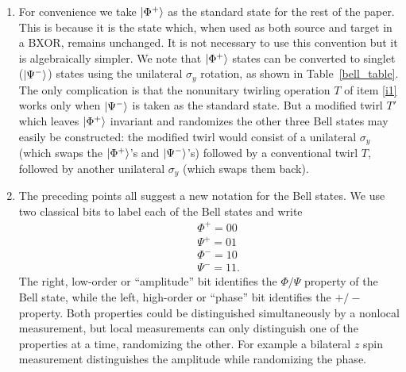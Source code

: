 \begin{enumerate}
\item For convenience we take $| \Phi^+ \rangle$ as the standard state for
the rest of the paper.  This is because it is the state which, when
used as both source and target in a BXOR, remains unchanged.  It is
not necessary to use this convention but it is algebraically simpler.
We note that $| \Phi^+ \rangle$ states can be converted to singlet
($| \Psi^- \rangle$) states using the unilateral $\sigma_y$ rotation, as
shown in Table~\ref{bell_table}.  The only complication is that the
nonunitary twirling operation $T$ of item \ref{i1} works only when
$| \Psi^- \rangle$ is taken as the standard state.  But a modified twirl
$T'$ which leaves $| \Phi^+ \rangle$ invariant and randomizes the other
three Bell states may easily be constructed: the modified twirl would
consist of a unilateral $\sigma_y$ (which swaps the $| \Phi^+ \rangle$'s
and $| \Psi^- \rangle$'s) followed by a conventional twirl $T$, followed
by another unilateral $\sigma_y$ (which swaps them back).\label{i5}
 
\item The preceding points all suggest a new notation for the Bell
states.  We use two classical bits to label each of the Bell states
and write
\begin{eqnarray}
&&\Phi^+=00\nonumber\\
&&\Psi^+=01\nonumber\\
&&\Phi^-=10\nonumber\\
&&\Psi^-=11.
\label{2bit}
\end{eqnarray}
The right, low-order or ``amplitude'' bit identifies the $\Phi/\Psi$
property of the Bell state, while the left, high-order or ``phase''
bit identifies the $+/-$ property.  Both properties could be
distinguished simultaneously by a nonlocal measurement, but local
measurements can only distinguish one of the properties at a time,
randomizing the other.  For example a bilateral $z$ spin measurement
distinguishes the amplitude while randomizing the phase.\label{i6}
\end{enumerate}
 
